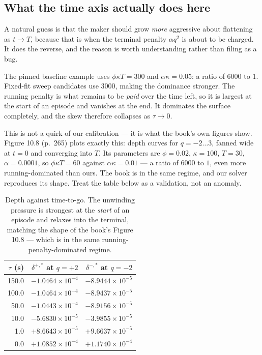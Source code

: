 \documentclass[11pt,a4paper]{article}
\begin{document}
\subsection{What the time axis actually does here}
\label{sec:phialpha}

A natural guess is that the maker should grow \emph{more} aggressive about
flattening as $t \to T$, because that is when the terminal penalty $\alpha q^2$
is about to be charged. It does the reverse, and the reason is worth
understanding rather than filing as a bug.

The pinned baseline example uses $\phi\kappa T = 300$ and
$\alpha\kappa = 0.05$: a ratio of $6000$ to $1$. Fixed-fit sweep candidates use
$3000$, making the dominance stronger. The running penalty is what
remains to be \emph{paid} over the time left, so it is largest at the start of an
episode and vanishes at the end. It dominates the surface completely, and the
skew therefore collapses as $\tau \to 0$.

\begin{intuition}
This is not a quirk of our calibration --- it is what the book's own figures
show. Figure 10.8 (p.~265) plots exactly this: depth curves for
$q = -2 \dots 3$, fanned wide at $t=0$ and converging into $T$. Its parameters
are $\phi = 0.02$, $\kappa = 100$, $T = 30$, $\alpha = 0.0001$, so
$\phi\kappa T = 60$ against $\alpha\kappa = 0.01$ --- a ratio of $6000$ to $1$,
even more running-dominated than ours. The book is in the same regime, and our
solver reproduces its shape. Treat the table below as a validation, not an
anomaly.
\end{intuition}

\begin{table}[htbp]
\centering\small
\begin{tabular}{@{}rrr@{}}
\toprule
$\tau$ (s) & $\delta^{+,*}$ at $q=+2$ & $\delta^{-,*}$ at $q=-2$ \\
\midrule
150.0 & $-1.0464\times10^{-4}$ & $-8.9444\times10^{-5}$ \\
100.0 & $-1.0464\times10^{-4}$ & $-8.9437\times10^{-5}$ \\
 50.0 & $-1.0443\times10^{-4}$ & $-8.9156\times10^{-5}$ \\
 10.0 & $-5.6830\times10^{-5}$ & $-3.9855\times10^{-5}$ \\
  1.0 & $+8.6643\times10^{-5}$ & $+9.6637\times10^{-5}$ \\
  0.0 & $+1.0852\times10^{-4}$ & $+1.1740\times10^{-4}$ \\
\bottomrule
\end{tabular}
\caption{Depth against time-to-go. The unwinding pressure is strongest at the
\emph{start} of an episode and relaxes into the terminal, matching the shape of
the book's Figure 10.8 --- which is in the same running-penalty-dominated regime.}
\label{tab:timeaxis}
\end{table}
\end{document}

